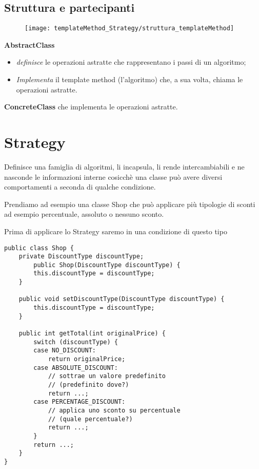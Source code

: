 \subsection{Struttura e partecipanti}

\begin{figure}[H]
    \centering
    \texttt{[image: templateMethod\_Strategy/struttura\_templateMethod]}    
\end{figure}

\textbf{AbstractClass} 

\begin{itemize}
    \item \textit{definisce} le operazioni astratte che rappresentano i passi di un algoritmo;
    \item \textit{Implementa} il template method (l’algoritmo) che, a sua volta, chiama le operazioni astratte.
\end{itemize}

\textbf{ConcreteClass} che implementa le operazioni astratte.

\section{Strategy}

Definisce una famiglia di algoritmi, li incapsula, li rende intercambiabili e ne nasconde le informazioni interne cosicchè una classe può avere diversi comportamenti 
a seconda di qualche condizione.
\smallskip

Prendiamo ad esempio una classe Shop che può applicare più tipologie di sconti ad esempio percentuale, assoluto o nessuno sconto.

Prima di applicare lo Strategy saremo in una condizione di questo tipo
\begin{lstlisting}
public class Shop {
    private DiscountType discountType;
        public Shop(DiscountType discountType) {
        this.discountType = discountType;
    }

    public void setDiscountType(DiscountType discountType) {
        this.discountType = discountType;
    }

    public int getTotal(int originalPrice) {
        switch (discountType) {
        case NO_DISCOUNT:
            return originalPrice;
        case ABSOLUTE_DISCOUNT:
            // sottrae un valore predefinito
            // (predefinito dove?)
            return ...;
        case PERCENTAGE_DISCOUNT:
            // applica uno sconto su percentuale
            // (quale percentuale?)
            return ...;
        }
        return ...;
    }
}
\end{lstlisting}

